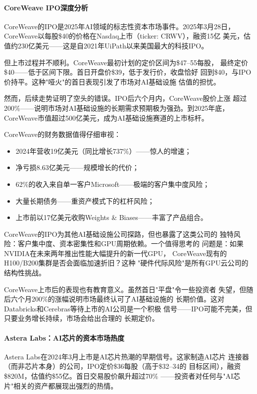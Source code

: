 \paragraph{CoreWeave IPO深度分析}

CoreWeave的IPO是2025年AI领域的标志性资本市场事件。2025年3月28日，
CoreWeave以每股\$40的价格在Nasdaq上市（ticker: CRWV），融资15亿
美元，估值约230亿美元——这是自2021年UiPath以来美国最大的科技IPO。

但上市过程并不顺利。CoreWeave最初计划的定价区间为\$47--55每股，
最终定价\$40——低于区间下限。首日开盘价\$39，低于发行价，收盘恰好
回到\$40，与IPO价持平。这种"哑火"的首日表现引发了市场对AI基础设施
估值的担忧。

然而，后续走势证明了空头的错误。IPO后六个月内，CoreWeave股价上涨
超过200\%——说明市场对AI基础设施的长期需求预期极为强劲。到2025年底，
CoreWeave市值超过500亿美元，成为AI基础设施赛道的上市标杆。

CoreWeave的财务数据值得仔细审视：
\begin{itemize}
  \item 2024年营收19亿美元（同比增长737\%）——惊人的增速；
  \item 净亏损8.63亿美元——规模增长的代价；
  \item 62\%的收入来自单一客户Microsoft——极端的客户集中度风险；
  \item 大量长期债务——重资产模式下的杠杆风险；
  \item 上市前以17亿美元收购Weights \& Biases——丰富了产品组合。
\end{itemize}

CoreWeave的IPO为其他AI基础设施公司探路，但也暴露了这类公司的
独特风险：客户集中度、资本密集性和GPU周期依赖。一个值得思考的
问题是：如果NVIDIA在未来两年推出性能大幅提升的新一代GPU，
CoreWeave现有的H100/B200集群是否会面临加速折旧？这种
"硬件代际风险"是所有GPU云公司的结构性挑战。

CoreWeave上市后的表现也有教育意义。虽然首日"平盘"令一些投资者
失望，但随后六个月200\%的涨幅说明市场最终认可了AI基础设施的
长期价值。这对Databricks和Cerebras等待上市的AI公司是一个积极
信号——IPO可能不完美，但只要业务增长持续，市场会给出合理的
长期定价。

\paragraph{Astera Labs：AI芯片的资本市场热度}

Astera Labs在2024年3月上市是AI芯片热潮的早期信号。这家制造AI芯片
连接器（而非芯片本身）的公司，IPO定价\$36每股（高于\$32--34的
目标区间），融资\$820M，估值约\$55亿。首日交易股价飙升超过70\%
——投资者对任何与"AI芯片"相关的资产都展现出强烈的热情。

